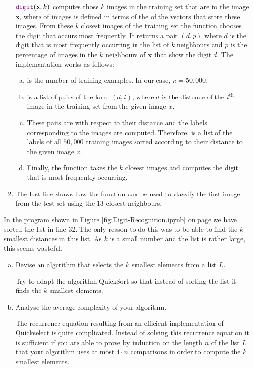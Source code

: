 \begin{enumerate}
      $\mytt{digit}(\mathbf{x}, k)$ computes those $k$ images in the training set  that are
       to the image $\mathbf{x}$, where  of images is defined in terms of the
       of the vectors that store these images.  From these $k$ closest images of the training
      set the function chooses the digit that occurs most frequently.  It returns a pair $(d, p)$ where $d$
      is the digit that is most frequently occurring in the list of $k$ neighbours and $p$ is the percentage
      of images in the $k$ neighbours of $\mathbf{x}$ that show the digit $d$.  The implementation works as follows:
      \begin{enumerate}[(a)]
      \item {} is the number of training examples.  In our case, $n = 50,000$.
      \item {} is a list of pairs of the form $(d, i)$, where $d$ is the distance
            of the $i^\mathrm{th}$ image in the training set from the given image $x$.
      \item These pairs are  with respect to their distance and the labels corresponding to the
            images are computed.  Therefore,  is a list of the labels of all $50,000$
            training images sorted according to their distance to the given image $x$.
      \item Finally, the function  takes the $k$ closest images and computes the digit that
            is most frequently occurring.
      \end{enumerate}
\item The last line shows how the function  can be used to classify the first image from the test
      set using the 13 closest neighbours. 
\end{enumerate}

\exercise
In the program shown in Figure \ref{fig:Digit-Recognition.ipynb} on page \pageref{fig:Digit-Recognition.ipynb}
we have sorted the list  in line 32.  The only reason to do this was to be able to find the $k$ smallest
distances in this list.  As $k$ is a small number and the list  is rather large, this seems wasteful.
\begin{enumerate}[(a)]
\item Devise an algorithm  that selects the $k$ smallest elements from a list $L$.

      \hint
      Try to adapt the algorithm QuickSort so that instead of sorting the list it finds the $k$ smallest elements.      
\item Analyse the average complexity of your algorithm.

      \hint
      The recurrence equation resulting from an efficient implementation of Quickselect is quite complicated.
      Instead of solving this recurrence equation it is sufficient if you are able to prove by induction on the
      length $n$ of the list $L$ that your algorithm uses at most $4 \cdot n$ comparisons in order to compute
      the $k$ smallest elements.
      \eox
\end{enumerate}   

